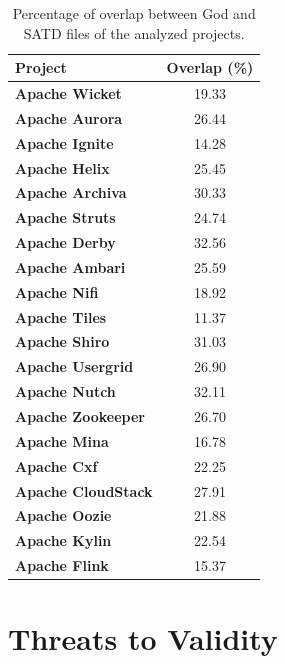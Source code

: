 {\begin{table}[!htbp]
\begin{tabular}{l|c}
		\textbf{Project}           & \textbf{Overlap (\%)} \\ \hline
		\textbf{Apache Wicket}     &    19.33     \\ \hline
		\textbf{Apache Aurora}     &    26.44     \\ \hline
		\textbf{Apache Ignite}     &    14.28     \\ \hline
		\textbf{Apache Helix}      &    25.45     \\ \hline
		\textbf{Apache Archiva}    &    30.33     \\ \hline
		\textbf{Apache Struts}     &    24.74     \\ \hline
		\textbf{Apache Derby}      &    32.56     \\ \hline
		\textbf{Apache Ambari}     &    25.59     \\ \hline
		\textbf{Apache Nifi}       &    18.92     \\ \hline
		\textbf{Apache Tiles}      &    11.37     \\ \hline
		\textbf{Apache Shiro}      &    31.03     \\ \hline
		\textbf{Apache Usergrid}   &    26.90     \\ \hline
		\textbf{Apache Nutch}      &    32.11     \\ \hline
		\textbf{Apache Zookeeper}  &    26.70     \\ \hline
		\textbf{Apache Mina}       &    16.78     \\ \hline
		\textbf{Apache Cxf}        &    22.25     \\ \hline
		\textbf{Apache CloudStack} &    27.91     \\ \hline
		\textbf{Apache Oozie}      &    21.88     \\ \hline
		\textbf{Apache Kylin}      &    22.54     \\ \hline
		\textbf{Apache Flink}      &    15.37     \\ \hline
	\end{tabular}
	\caption{Percentage of overlap between God and SATD files of the analyzed projects.}
	\label{ch4_amount_of_overlap}
\end{table}

\pagebreak



\section{Threats to Validity}
\label{chap4:sec:threats_to_validity}


}
